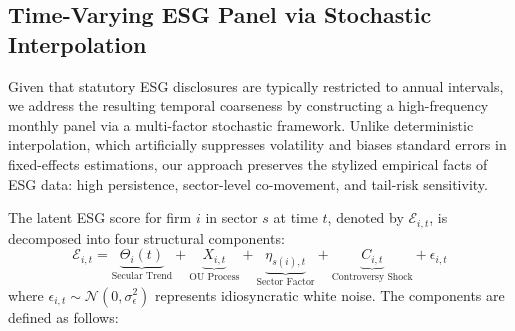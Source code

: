 \subsection{Time-Varying ESG Panel via Stochastic Interpolation}
\label{sec:stochastic_modeling}

Given that statutory ESG disclosures are typically restricted to annual intervals, we address the resulting temporal coarseness by constructing a high-frequency monthly panel via a multi-factor stochastic framework. Unlike deterministic interpolation, which artificially suppresses volatility and biases standard errors in fixed-effects estimations, our approach preserves the stylized empirical facts of ESG data: high persistence, sector-level co-movement, and tail-risk sensitivity.

The latent ESG score for firm $i$ in sector $s$ at time $t$, denoted by $\mathcal{E}_{i,t}$, is decomposed into four structural components:
\begin{equation}
  \mathcal{E}_{i,t} = \underbrace{\Theta_i(t)}_{\text{Secular Trend}} + \underbrace{X_{i,t}}_{\text{OU Process}} + \underbrace{\eta_{s(i),t}}_{\text{Sector Factor}} + \underbrace{C_{i,t}}_{\text{Controversy Shock}} + \epsilon_{i,t}
\end{equation}
where $\epsilon_{i,t} \sim \mathcal{N}(0, \sigma_\epsilon^2)$ represents idiosyncratic white noise. The components are defined as follows:
